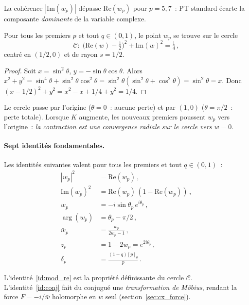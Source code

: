 \documentclass[12pt,a4paper]{article}
\begin{document}
La cohérence $|\mathrm{Im}(w_p)|$ dépasse $\mathrm{Re}(w_p)$ pour
$p = 5, 7$~: PT standard écarte la composante \emph{dominante} de la
variable complexe.

\begin{thmbox}
\label{thm:circle}
Pour tous les premiers $p$ et tout $q \in (0,1)$, le point $w_p$ se
trouve sur le cercle
\begin{equation}
  \mathcal{C}\colon\;
  \bigl(\mathrm{Re}(w) - \tfrac{1}{2}\bigr)^2 + \mathrm{Im}(w)^2
  = \tfrac{1}{4}\,,
  \label{eq:circle}
\end{equation}
centré en $(1/2, 0)$ et de rayon $s = 1/2$.
\end{thmbox}

\begin{proof}
Soit $x = \sin^2\theta$, $y = -\sin\theta\cos\theta$.
Alors $x^2 + y^2 = \sin^4\theta + \sin^2\theta\cos^2\theta
= \sin^2\theta(\sin^2\theta + \cos^2\theta) = \sin^2\theta = x$.
Donc $(x - 1/2)^2 + y^2 = x^2 - x + 1/4 + y^2 = 1/4$.
\end{proof}

Le cercle passe par l'origine ($\theta = 0$~: aucune perte) et par
$(1, 0)$ ($\theta = \pi/2$~: perte totale). Lorsque $K$ augmente, les
nouveaux premiers poussent $w_p$ vers l'origine~: \emph{la
contraction est une convergence radiale sur le cercle vers $w = 0$}.

\paragraph{Sept identités fondamentales.}
Les identités suivantes valent pour tous les premiers et tout
$q \in (0,1)$~:
\begin{align}
  |w_p|^2 &= \mathrm{Re}(w_p) \,,\tag{ID1}\label{id:mod_re}\\
  \mathrm{Im}(w_p)^2 &= \mathrm{Re}(w_p)\,(1 - \mathrm{Re}(w_p))\,,\tag{ID2}\label{id:im_parab}\\
  w_p &= -i\sin\theta_p\, e^{i\theta_p}\,,\tag{ID3}\label{id:polar}\\
  \arg(w_p) &= \theta_p - \pi/2\,,\tag{ID4}\label{id:arg}\\
  \bar{w}_p &= \frac{w_p}{2w_p - 1}\,,\tag{ID5}\label{id:conj}\\
  z_p &= 1 - 2w_p = e^{2i\theta_p}\,,\tag{ID6}\label{id:u1}\\
  \delta_p &= \frac{(1 - q)[p]_q}{p}\,.\tag{ID7}\label{id:qbracket}
\end{align}

L'identité~\ref{id:mod_re} est la propriété définissante du cercle
$\mathcal{C}$. L'identité~\ref{id:conj} fait du conjugué une
\emph{transformation de Möbius}, rendant la force
$F = -i/\bar{w}$ holomorphe en $w$ seul
(section~\ref{sec:cx_force}).
\end{document}
